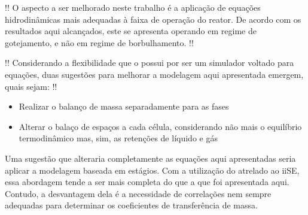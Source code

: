 !! O aspecto a ser melhorado neste trabalho é a aplicação de equações
hidrodinâmicas mais adequadas à faixa de operação do reator. De acordo
com os resultados aqui alcançados, este se apresenta operando em regime de
gotejamento, e não em regime de borbulhamento. !!

!! Considerando a flexibilidade que o \emso{} possui por ser um simulador
voltado para equações, duas sugestões para melhorar a modelagem aqui apresentada
emergem, quais sejam: !!

\begin{itemize}
\item {Realizar o balanço de massa separadamente para as fases}
\item {Alterar o balaço de espaços a cada célula, considerando não mais o
equilíbrio termodinâmico mas, sim, as retenções de líquido e gás}
\end{itemize}

Uma sugestão que alteraria completamente as equações aqui apresentadas seria
aplicar a modelagem baseada em estágios. Com a utilização do \emso{} atrelado ao
iiSE, essa abordagem tende a ser mais completa do que a que foi apresentada
aqui. Contudo, a desvantagem dela é a necessidade de correlações nem sempre
adequadas para determinar os coeficientes de transferência de massa.

